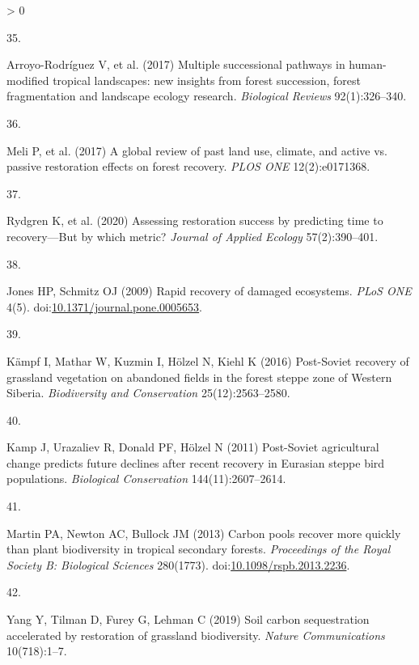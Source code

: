 \documentclass[9pt,twocolumn,twoside,]{pnas-new}
\newlength{\csllabelwidth}
\newlength{\cslhangindent}
\newenvironment{CSLReferences}[2] %
 {%
  \setlength{\parindent}{0pt}
  \ifodd #1 \everypar{\setlength{\hangindent}{\cslhangindent}}\ignorespaces\fi
  \ifnum #2 > 0
  \setlength{\parskip}{#2\baselineskip}
  \fi
 }%
 {}
\newcommand{\CSLLeftMargin}[1]{\parbox[t]{\csllabelwidth}{#1}}
\newcommand{\CSLRightInline}[1]{\parbox[t]{\linewidth - \csllabelwidth}{#1}\break}
\begin{document}
\begin{CSLReferences}{0}{0}
\leavevmode\hypertarget{ref-Arroyo-Rodriguez2017}{}%
\CSLLeftMargin{35. }
\CSLRightInline{Arroyo-Rodríguez V, et al. (2017) {Multiple successional
pathways in human-modified tropical landscapes: new insights from forest
succession, forest fragmentation and landscape ecology research}.
\emph{Biological Reviews} 92(1):326--340.}

\leavevmode\hypertarget{ref-Meli2017}{}%
\CSLLeftMargin{36. }
\CSLRightInline{Meli P, et al. (2017) {A global review of past land use,
climate, and active vs. passive restoration effects on forest recovery}.
\emph{PLOS ONE} 12(2):e0171368.}

\leavevmode\hypertarget{ref-Rydgren2020}{}%
\CSLLeftMargin{37. }
\CSLRightInline{Rydgren K, et al. (2020) {Assessing restoration success
by predicting time to recovery---But by which metric?} \emph{Journal of
Applied Ecology} 57(2):390--401.}

\leavevmode\hypertarget{ref-Jones2009}{}%
\CSLLeftMargin{38. }
\CSLRightInline{Jones HP, Schmitz OJ (2009) {Rapid recovery of damaged
ecosystems}. \emph{PLoS ONE} 4(5).
doi:\href{https://doi.org/10.1371/journal.pone.0005653}{10.1371/journal.pone.0005653}.}

\leavevmode\hypertarget{ref-Kampf2016}{}%
\CSLLeftMargin{39. }
\CSLRightInline{Kämpf I, Mathar W, Kuzmin I, Hölzel N, Kiehl K (2016)
{Post-Soviet recovery of grassland vegetation on abandoned fields in the
forest steppe zone of Western Siberia}. \emph{Biodiversity and
Conservation} 25(12):2563--2580.}

\leavevmode\hypertarget{ref-Kamp2011}{}%
\CSLLeftMargin{40. }
\CSLRightInline{Kamp J, Urazaliev R, Donald PF, Hölzel N (2011)
{Post-Soviet agricultural change predicts future declines after recent
recovery in Eurasian steppe bird populations}. \emph{Biological
Conservation} 144(11):2607--2614.}

\leavevmode\hypertarget{ref-Martin2013}{}%
\CSLLeftMargin{41. }
\CSLRightInline{Martin PA, Newton AC, Bullock JM (2013) {Carbon pools
recover more quickly than plant biodiversity in tropical secondary
forests}. \emph{Proceedings of the Royal Society B: Biological Sciences}
280(1773).
doi:\href{https://doi.org/10.1098/rspb.2013.2236}{10.1098/rspb.2013.2236}.}

\leavevmode\hypertarget{ref-Yang2019}{}%
\CSLLeftMargin{42. }
\CSLRightInline{Yang Y, Tilman D, Furey G, Lehman C (2019) {Soil carbon
sequestration accelerated by restoration of grassland biodiversity}.
\emph{Nature Communications} 10(718):1--7.}


\end{CSLReferences}
\end{document}
